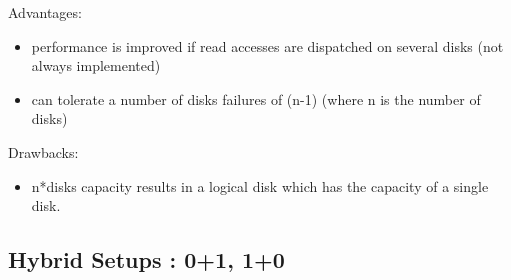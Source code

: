 Advantages:

\begin{itemize}
  \item performance is improved if read accesses are dispatched on several disks (not always implemented)
  \item can tolerate a number of disks failures of (n-1) (where n is the number of disks)
\end{itemize}

Drawbacks:

\begin{itemize}
  \item n*disks capacity results in a logical disk which has the capacity of a single disk. 
\end{itemize}

\subsection{Hybrid Setups : 0+1, 1+0}


